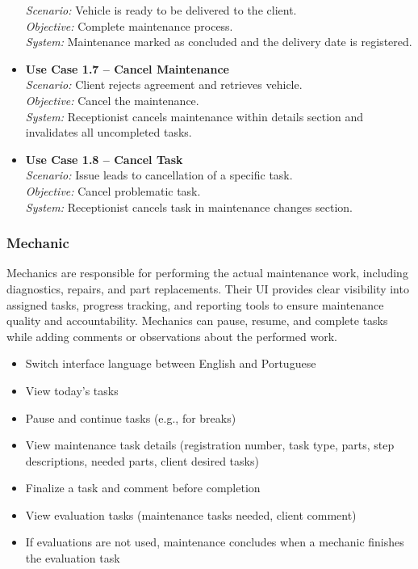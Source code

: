 \begin{itemize}
    \textit{Scenario:} Vehicle is ready to be delivered to the client.\\
    \textit{Objective:} Complete maintenance process.\\
    \textit{System:} Maintenance marked as concluded and the delivery date is registered.
    \item \textbf{Use Case 1.7 – Cancel Maintenance}\\
    \textit{Scenario:} Client rejects agreement and retrieves vehicle.\\
    \textit{Objective:} Cancel the maintenance.\\
    \textit{System:} Receptionist cancels maintenance within details section and invalidates all uncompleted tasks.
    \item \textbf{Use Case 1.8 – Cancel Task}\\
    \textit{Scenario:} Issue leads to cancellation of a specific task.\\
    \textit{Objective:} Cancel problematic task.\\
    \textit{System:} Receptionist cancels task in maintenance changes section.
\end{itemize}


\subsubsection{Mechanic}

Mechanics are responsible for performing the actual maintenance work, including diagnostics, repairs, and part replacements. Their \ac{UI} provides clear visibility into assigned tasks, progress tracking, and reporting tools to ensure maintenance quality and accountability. Mechanics can pause, resume, and complete tasks while adding comments or observations about the performed work.


\begin{itemize}
    \item Switch interface language between English and Portuguese
    \item View today's tasks
    \item Pause and continue tasks (e.g., for breaks)
    \item View maintenance task details (registration number, task type, parts, step descriptions, needed parts, client desired tasks)
    \item Finalize a task and comment before completion
    \item View evaluation tasks (maintenance tasks needed, client comment)
    \item If evaluations are not used, maintenance concludes when a mechanic finishes the evaluation task
\end{itemize}

